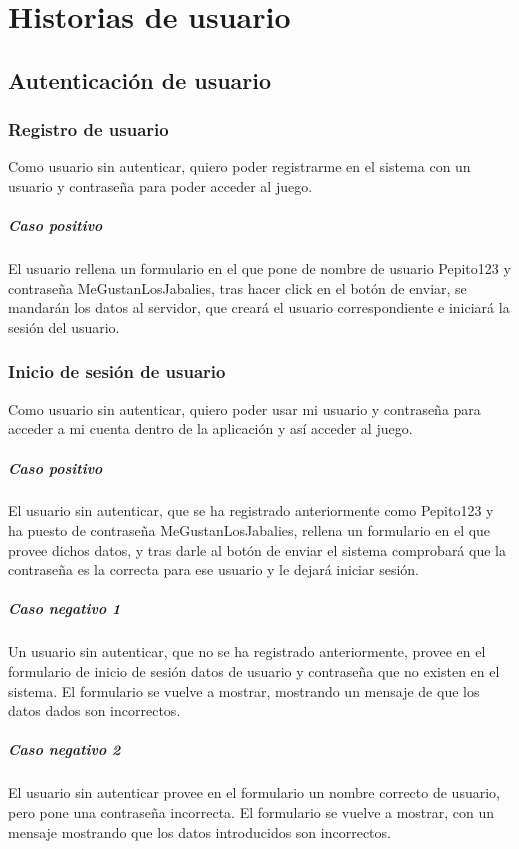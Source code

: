 \section{Historias de usuario}
\subsection{Autenticación de usuario}

\subsubsection{Registro de usuario}

Como usuario sin autenticar, quiero poder registrarme en el sistema con un usuario y contraseña para poder acceder al juego. 

\subparagraph{Caso positivo} %

El usuario rellena un formulario en el que pone de nombre de usuario Pepito123 y contraseña MeGustanLosJabalies, tras hacer click en el botón de enviar, se mandarán los datos al servidor, que creará el usuario correspondiente e iniciará la sesión del usuario. 

\subsubsection{Inicio de sesión de usuario}

Como usuario sin autenticar, quiero poder usar mi usuario y contraseña para acceder a mi cuenta dentro de la aplicación y así acceder al juego. 

\subparagraph{Caso positivo}

El usuario sin autenticar, que se ha registrado anteriormente como Pepito123 y ha puesto de contraseña MeGustanLosJabalies, rellena un formulario en el que provee dichos datos, y tras darle al botón de enviar el sistema comprobará que la contraseña es la correcta para ese usuario y le dejará iniciar sesión. 

\subparagraph{Caso negativo 1}

Un usuario sin autenticar, que no se ha registrado anteriormente, provee en el formulario de inicio de sesión datos de usuario y contraseña que no existen en el sistema. El formulario se vuelve a mostrar, mostrando un mensaje de que los datos dados son incorrectos. 

\subparagraph{Caso negativo 2}

El usuario sin autenticar provee en el formulario un nombre correcto de usuario, pero pone una contraseña incorrecta. El formulario se vuelve a mostrar, con un mensaje mostrando que los datos introducidos son incorrectos. 

